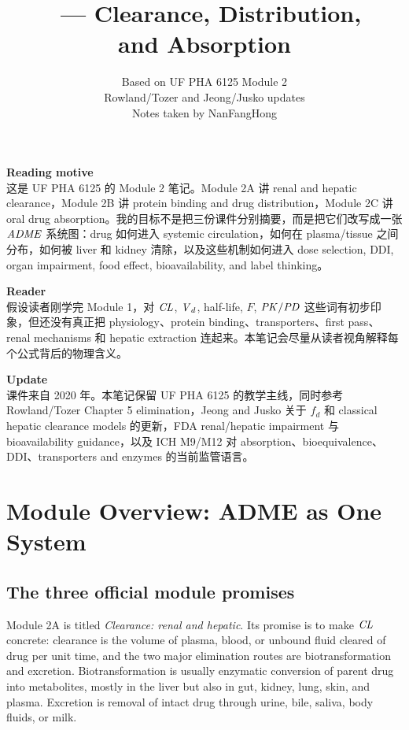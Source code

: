 \documentclass[a4paper]{article}
\title{\npart\ --- Clearance, Distribution,\\ and Absorption}
\author{Based on UF PHA 6125 Module 2\\\small Rowland/Tozer and Jeong/Jusko updates\\\small Notes taken by NanFangHong}
\newcommand{\CL}{\ensuremath{\pksym{CL}}}
\newcommand{\Vd}{\ensuremath{\pksym{V}_d}}
\newcommand{\Fbio}{\ensuremath{F}}
\newcommand{\fd}{\ensuremath{f_d}}
\newcommand{\PKPD}{\ensuremath{\pksym{PK}/\pksym{PD}}}
\newcommand{\ADME}{\ensuremath{\pksym{ADME}}}
\begin{document}
\maketitle
{\small
  \noindent\textbf{Reading motive}\\
  这是 UF PHA 6125 的 Module 2 笔记。Module 2A 讲 renal and hepatic clearance，Module 2B 讲 protein binding and drug distribution，Module 2C 讲 oral drug absorption。我的目标不是把三份课件分别摘要，而是把它们改写成一张 \ADME{} 系统图：drug 如何进入 systemic circulation，如何在 plasma/tissue 之间分布，如何被 liver 和 kidney 清除，以及这些机制如何进入 dose selection, DDI, organ impairment, food effect, bioavailability, and label thinking。
  \begin{flushright}\end{flushright}

  \vspace{5pt}
  \noindent\textbf{Reader}\\
  假设读者刚学完 Module 1，对 \CL, \Vd, half-life, \Fbio{}, \PKPD{} 这些词有初步印象，但还没有真正把 physiology、protein binding、transporters、first pass、renal mechanisms 和 hepatic extraction 连起来。本笔记会尽量从读者视角解释每个公式背后的物理含义。
  \begin{flushright}\end{flushright}

  \vspace{5pt}
  \noindent\textbf{Update}\\
  课件来自 2020 年。本笔记保留 UF PHA 6125 的教学主线，同时参考 Rowland/Tozer Chapter 5 elimination，Jeong and Jusko 关于 \fd{} 和 classical hepatic clearance models 的更新，FDA renal/hepatic impairment 与 bioavailability guidance，以及 ICH M9/M12 对 absorption、bioequivalence、DDI、transporters and enzymes 的当前监管语言。
  \begin{flushright}[2026 view]\end{flushright}
}

\tableofcontents

\section{Module Overview: ADME as One System}

\subsection{The three official module promises}

Module 2A is titled \emph{Clearance: renal and hepatic}. Its promise is to make \CL{} concrete: clearance is the volume of plasma, blood, or unbound fluid cleared of drug per unit time, and the two major elimination routes are biotransformation and excretion. Biotransformation is usually enzymatic conversion of parent drug into metabolites, mostly in the liver but also in gut, kidney, lung, skin, and plasma. Excretion is removal of intact drug through urine, bile, saliva, body fluids, or milk.
\end{document}

